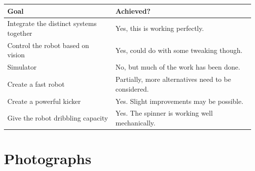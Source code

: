 \documentclass[12pt, a4paper, titlepage]{article}
\begin{document}
\begin{tabular}{| l | l |}
  \hline
  \textbf{Goal}                           & \textbf{Achieved?}                                  \\
  \hline
  Integrate the distinct systems together & Yes, this is working perfectly.                     \\
  Control the robot based on vision       & Yes, could do with some tweaking though.            \\
  Simulator                               & No, but much of the work has been done.             \\
  Create a fast robot                     & Partially, more alternatives need to be considered. \\
  Create a powerful kicker                & Yes. Slight improvements may be possible.           \\
  Give the robot dribbling capacity       & Yes. The spinner is working well mechanically.      \\
  \hline
\end{tabular}

\section{Photographs}
\end{document}
